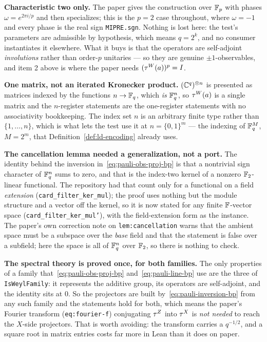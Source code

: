 \textbf{Characteristic two only.} The paper gives the construction over $\mathbb{F}_p$ with phases
$\omega = e^{2\pi i/p}$ and then specializes; this is the $p = 2$ case throughout, where
$\omega = -1$ and every phase is the real sign \texttt{MIPRE.sgn}. Nothing is lost here: the test's
parameters are admissible by hypothesis, which means $q = 2^k$, and no consumer instantiates it
elsewhere. What it buys is that the operators are self-adjoint \emph{involutions} rather than
order-$p$ unitaries --- so they are genuine $\pm 1$-observables, and item 2 above is where the
paper needs $(\tau^W(a))^p = I$.

\textbf{One matrix, not an iterated Kronecker product.} $(\mathbb{C}^q)^{\otimes n}$ is presented as matrices
indexed by the functions $n \to \mathbb{F}_q$, which \emph{is} $\mathbb{F}_q^n$, so $\tau^W(a)$ is a single matrix
and the $n$-register statements are the one-register statements with no associativity
bookkeeping. The index set $n$ is an arbitrary finite type rather than $\{1, \ldots, n\}$, which is
what lets the test use it at $n = \{0,1\}^m$ --- the indexing of $\mathbb{F}_q^M$, $M = 2^m$, that
Definition~\ref{def:ld-encoding} already uses.

\textbf{The cancellation lemma needed a generalization, not a port.} The identity behind the
inversion in~\eqref{eq:pauli-obs-proj-bp} is that a nontrivial sign character of $\mathbb{F}_q^n$ sums to
zero, and that is the index-two kernel of a nonzero $\mathbb{F}_2$-linear functional. The repository had
that count only for a functional on a field \emph{extension}
(\texttt{card\_filter\_ker\_mul}); the proof uses nothing but the module structure and a vector
off the kernel, so it is now stated for any finite $\mathbb{F}$-vector space
(\texttt{card\_filter\_ker\_mul'}), with the field-extension form as the instance. The paper's own
correction note on \texttt{lem:cancellation} warns that the ambient space must be a subspace over the
\emph{base} field and that the statement is false over a subfield; here the space is all of
$\mathbb{F}_q^n$ over $\mathbb{F}_2$, so there is nothing to check.

\textbf{The spectral theory is proved once, for both families.} The only properties of a family
that~\eqref{eq:pauli-obs-proj-bp} and~\eqref{eq:pauli-line-bp} use are the three of
\texttt{IsWeylFamily}: it represents the additive group, its operators are self-adjoint, and the
identity sits at $0$. So the projectors are built by~\eqref{eq:pauli-inversion-bp} from any such
family and the statements hold for both, which means the paper's Fourier transform
(\texttt{eq:fourier-f}) conjugating $\tau^Z$ into $\tau^X$ is \emph{not needed} to reach the
$X$-side projectors. That is worth avoiding: the transform carries a $q^{-1/2}$, and a square root
in matrix entries costs far more in Lean than it does on paper.

